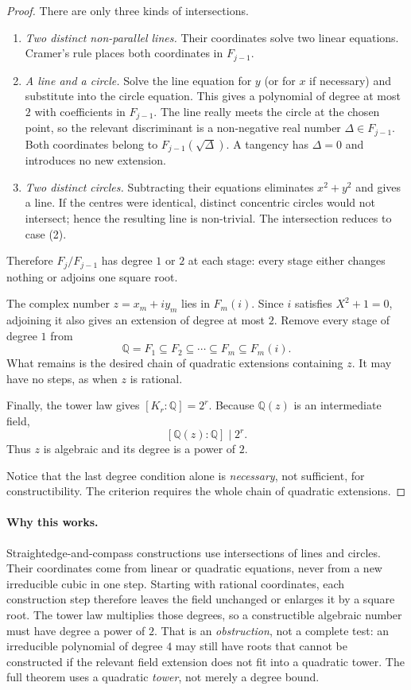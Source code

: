 \begin{proof}
There are only three kinds of intersections.
\begin{enumerate}[label=(\arabic*)]
\item \emph{Two distinct non-parallel lines.}
Their coordinates solve two linear equations. Cramer's rule places
both coordinates in $F_{j-1}$.
\item \emph{A line and a circle.}
Solve the line equation for $y$ (or for $x$ if necessary) and
substitute into the circle equation. This gives a polynomial
of degree at most $2$ with coefficients in $F_{j-1}$.
The line really meets the circle at the chosen point, so the
relevant discriminant is a non-negative real number
$\Delta\in F_{j-1}$. Both coordinates belong to
$F_{j-1}(\sqrt\Delta)$.
A tangency has $\Delta=0$ and introduces no new extension.
\item \emph{Two distinct circles.}
Subtracting their equations eliminates $x^2+y^2$ and gives a
line. If the centres were identical, distinct concentric circles
would not intersect; hence the resulting line is non-trivial.
The intersection reduces to case (2).
\end{enumerate}
Therefore $F_j/F_{j-1}$ has degree $1$ or $2$ at each stage:
every stage either changes nothing or adjoins one square root.

The complex number $z=x_m+iy_m$ lies in $F_m(i)$.
Since $i$ satisfies $X^2+1=0$, adjoining it also gives an
extension of degree at most $2$. Remove every stage of degree
$1$ from
\[
\mathbb Q=F_1\subseteq F_2\subseteq\cdots
\subseteq F_m\subseteq F_m(i).
\]
What remains is the desired chain of quadratic extensions
containing $z$. It may have no steps, as when $z$ is rational.

Finally, the tower law gives $[K_r:\mathbb Q]=2^r$.
Because $\mathbb Q(z)$ is an intermediate field,
\[
[\mathbb Q(z):\mathbb Q]\mid2^r.
\]
Thus $z$ is algebraic and its degree is a power of $2$.

Notice that the last degree condition alone is \emph{necessary},
not sufficient, for constructibility. The criterion requires the
whole chain of quadratic extensions.
\end{proof}

\paragraph{Why this works.}
Straightedge-and-compass constructions use intersections of lines and circles. Their coordinates come from linear or quadratic equations, never from a new irreducible cubic in one step. Starting with rational coordinates, each construction step therefore leaves the field unchanged or enlarges it by a square root. The tower law multiplies those degrees, so a constructible algebraic number must have degree a power of $2$. That is an \emph{obstruction}, not a complete test: an irreducible polynomial of degree $4$ may still have roots that cannot be constructed if the relevant field extension does not fit into a quadratic tower. The full theorem uses a quadratic \emph{tower}, not merely a degree bound.


